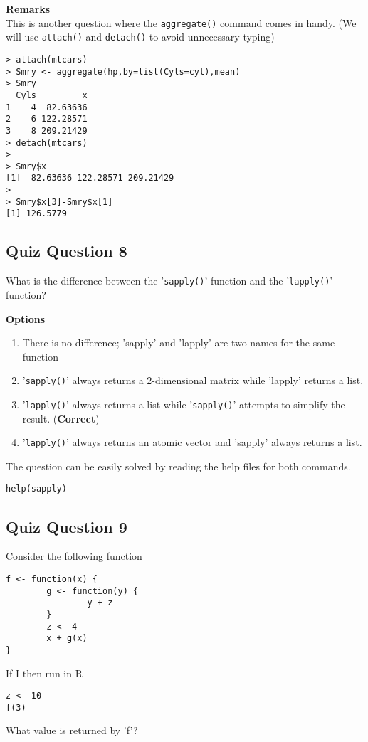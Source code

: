 \documentclass[12pt]{article}
\begin{document}
\bigskip
\textbf{Remarks}\\
This is another question where the \texttt{aggregate()} command comes in handy. (We will use \texttt{attach()} and \texttt{detach()} to avoid unnecessary typing)
\begin{verbatim}
> attach(mtcars)
> Smry <- aggregate(hp,by=list(Cyls=cyl),mean)
> Smry 
  Cyls         x
1    4  82.63636
2    6 122.28571
3    8 209.21429
> detach(mtcars)
>
> Smry$x
[1]  82.63636 122.28571 209.21429
>
> Smry$x[3]-Smry$x[1]
[1] 126.5779
\end{verbatim}


\newpage
\subsection*{Quiz Question 8}
What is the difference between the '\texttt{sapply()}' function and the '\texttt{lapply()}' function?

\textbf{Options}
\begin{enumerate}
\item There is no difference; 'sapply' and 'lapply' are two names for the same function
\item '\texttt{sapply()}' always returns a 2-dimensional matrix while 'lapply' returns a list.
\item '\texttt{lapply()}' always returns a list while '\texttt{sapply()}' attempts to simplify the result. (\textbf{Correct})
\item '\texttt{lapply()}' always returns an atomic vector and 'sapply' always returns a list.
\end{enumerate}

\noindent The question can be easily solved by reading the help files for both commands.
\begin{verbatim}
help(sapply)
\end{verbatim}
\newpage
\subsection*{Quiz Question 9}
Consider the following function
\begin{verbatim}
f <- function(x) {
        g <- function(y) {
                y + z
        }
        z <- 4
        x + g(x)
}
\end{verbatim}

If I then run in R
\begin{verbatim}
z <- 10
f(3)
\end{verbatim}
What value is returned by 'f'?
\end{document}
